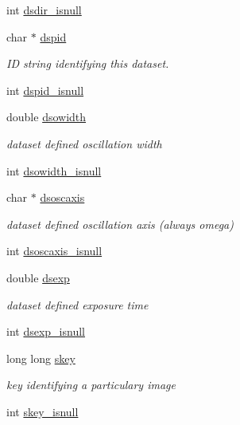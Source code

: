 \begin{DoxyCompactItemize}
int \hyperlink{structlspg__nextshot__struct_a8dea57b78b92d67d83ccbb6ed6da13ca}{dsdir\-\_\-isnull}
\item 
char $\ast$ \hyperlink{structlspg__nextshot__struct_a4487e718c2b55a8ab9ebb18329574ae1}{dspid}
\begin{DoxyCompactList}\small\item\em I\-D string identifying this dataset. \end{DoxyCompactList}\item 
int \hyperlink{structlspg__nextshot__struct_a7665485395487756ab448d0c81c84d10}{dspid\-\_\-isnull}
\item 
double \hyperlink{structlspg__nextshot__struct_ad5a8f568a04aa6a13767933062b28f19}{dsowidth}
\begin{DoxyCompactList}\small\item\em dataset defined oscillation width \end{DoxyCompactList}\item 
int \hyperlink{structlspg__nextshot__struct_a5dd3db64790e09bc03499e521bbaa126}{dsowidth\-\_\-isnull}
\item 
char $\ast$ \hyperlink{structlspg__nextshot__struct_a9a62c304e66013e8e5e5618a44f0b6d4}{dsoscaxis}
\begin{DoxyCompactList}\small\item\em dataset defined oscillation axis (always omega) \end{DoxyCompactList}\item 
int \hyperlink{structlspg__nextshot__struct_a51a26391afcacfb4c946fb9e8e9ab6b0}{dsoscaxis\-\_\-isnull}
\item 
double \hyperlink{structlspg__nextshot__struct_a063e4c99201a763c2eb048acfc855efa}{dsexp}
\begin{DoxyCompactList}\small\item\em dataset defined exposure time \end{DoxyCompactList}\item 
int \hyperlink{structlspg__nextshot__struct_ae07498f62ea9c0e2f702b78c87500794}{dsexp\-\_\-isnull}
\item 
long long \hyperlink{structlspg__nextshot__struct_af64a4e3f17752b5f1f05fb15d6f48382}{skey}
\begin{DoxyCompactList}\small\item\em key identifying a particulary image \end{DoxyCompactList}\item 
int \hyperlink{structlspg__nextshot__struct_abd3c69357470052eb79ddd8eddd57b2c}{skey\-\_\-isnull}

\end{DoxyCompactItemize}
